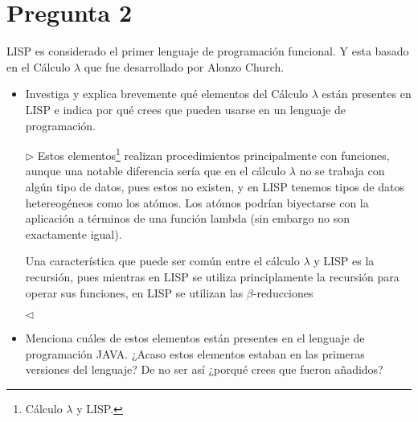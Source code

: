 \newpage
\section*{Pregunta 2}

LISP es considerado el primer lenguaje de programación funcional. Y esta basado en el Cálculo $\lambda$ que fue desarrollado por Alonzo Church.

\begin{itemize}
\item Investiga y explica brevemente qué elementos del Cálculo $\lambda$ están presentes en LISP e indica por qué crees que pueden usarse en un lenguaje de programación.

$\rhd$ Estos elementos\footnote{Cálculo $\lambda$ y LISP.} realizan
procedimientos principalmente con funciones, aunque una notable diferencia
sería que en el cálculo $\lambda$ no se trabaja con algún tipo de datos,
pues estos no existen, y en LISP tenemos tipos de datos hetereogéneos como
los atómos. Los atómos podrían biyectarse con la aplicación a términos de
una función lambda (sin embargo no son exactamente igual).

Una característica que puede ser común entre el cálculo $\lambda$ y LISP es
la recursión, pues mientras en LISP se utiliza principlamente la recursión
para operar sus funciones, en LISP se utilizan las $\beta$-reducciones

\hfill $\lhd$
\item Menciona cuáles de estos elementos están presentes en el lenguaje de programación JAVA. ¿Acaso estos elementos estaban en las primeras versiones del lenguaje? De no ser así ¿porqué crees que fueron añadidos?
\end{itemize}

